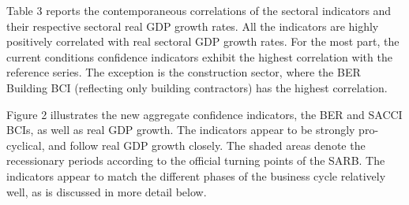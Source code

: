 \documentclass[11pt,]{article}
\begin{document}
Table 3 reports the contemporaneous correlations of the sectoral
indicators and their respective sectoral real GDP growth rates. All the
indicators are highly positively correlated with real sectoral GDP
growth rates. For the most part, the current conditions confidence
indicators exhibit the highest correlation with the reference series.
The exception is the construction sector, where the BER Building BCI
(reflecting only building contractors) has the highest correlation.

\begin{table}[ht]
\centering
\caption{Correlations between sectoral confidence and real sectoral GDP growth} 
\end{table}

Figure 2 illustrates the new aggregate confidence indicators, the BER
and SACCI BCIs, as well as real GDP growth. The indicators appear to be
strongly pro-cyclical, and follow real GDP growth closely. The shaded
areas denote the recessionary periods according to the official turning
points of the SARB. The indicators appear to match the different phases
of the business cycle relatively well, as is discussed in more detail
below.
\end{document}
